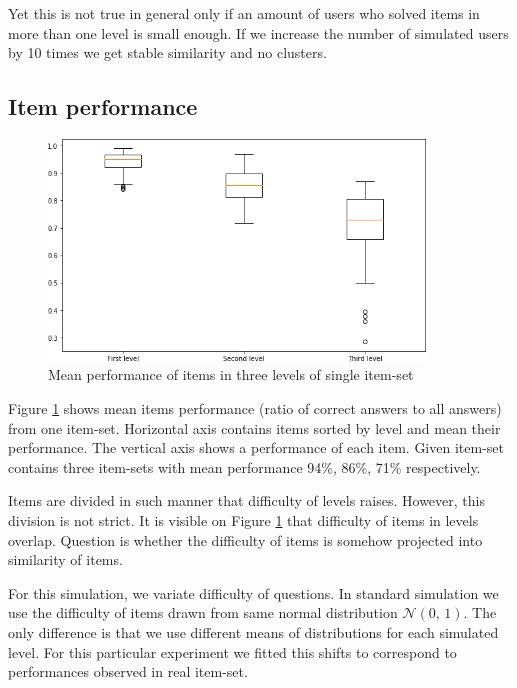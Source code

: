 \documentclass[
  digital, %
  table,   %
  nolof,     %
  nolot,     %
  nocover,
  color,
  final, %
]{fithesis3}
\begin{document}
Yet this is not true in general only if an amount of users who solved items in more than one level is small enough. If we increase the number of simulated users by 10 times we get stable similarity and no clusters.


\subsection{Item performance}\label{item-performance}

\begin{figure}
  \includegraphics[width=10cm]{img/items_performance_levels}
  \caption{Mean performance of items in three levels of single item-set}
  \label{fig:item_performance_levels}
\end{figure}

Figure \ref{fig:item_performance_levels} shows mean items performance (ratio of correct answers to all answers) from one item-set. Horizontal axis contains items sorted by level and mean their performance. The vertical axis shows a performance of each item. Given item-set contains three item-sets with mean performance 94\%, 86\%, 71\% respectively.

Items are divided in such manner that difficulty of levels raises. However, this division is not strict. It is visible on Figure \ref{fig:item_performance_levels} that difficulty of items in levels overlap. Question is whether the difficulty of items is somehow projected into similarity of items.

For this simulation, we variate difficulty of questions. In standard simulation we use the difficulty of items drawn from same normal distribution $\mathcal{N}(0,\,1)$. The only difference is that we use different means of distributions for each simulated level. For this particular experiment we fitted this shifts to correspond to performances observed in real item-set.
\end{document}

